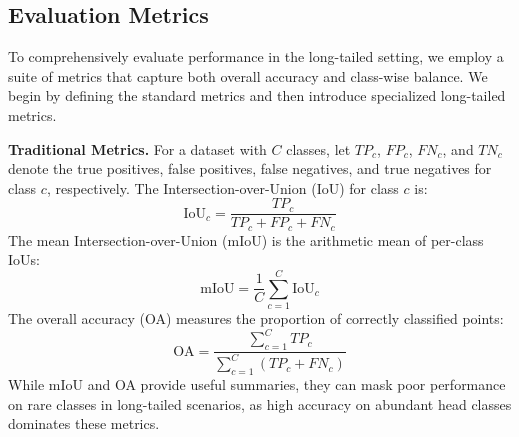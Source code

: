 \documentclass[preprint,12pt]{elsarticle}
\begin{document}
\subsection{Evaluation Metrics}
\label{sec:evaluation_metrics}
To comprehensively evaluate performance in the long-tailed setting, we employ a suite of metrics that capture both overall accuracy and class-wise balance. We begin by defining the standard metrics and then introduce specialized long-tailed metrics.

\textbf{Traditional Metrics.} For a dataset with \(C\) classes, let \(TP_c\), \(FP_c\), \(FN_c\), and \(TN_c\) denote the true positives, false positives, false negatives, and true negatives for class \(c\), respectively. The Intersection-over-Union (IoU) for class \(c\) is:
\begin{equation}
\label{eq:iou}
\text{IoU}_c = \frac{TP_c}{TP_c + FP_c + FN_c}
\end{equation}
The mean Intersection-over-Union (mIoU) is the arithmetic mean of per-class IoUs:
\begin{equation}
\label{eq:miou}
\text{mIoU} = \frac{1}{C} \sum_{c=1}^{C} \text{IoU}_c
\end{equation}
The overall accuracy (OA) measures the proportion of correctly classified points:
\begin{equation}
\label{eq:oa}
\text{OA} = \frac{\sum_{c=1}^{C} TP_c}{\sum_{c=1}^{C} (TP_c + FN_c)}
\end{equation}
While mIoU and OA provide useful summaries, they can mask poor performance on rare classes in long-tailed scenarios, as high accuracy on abundant head classes dominates these metrics.
\end{document}
